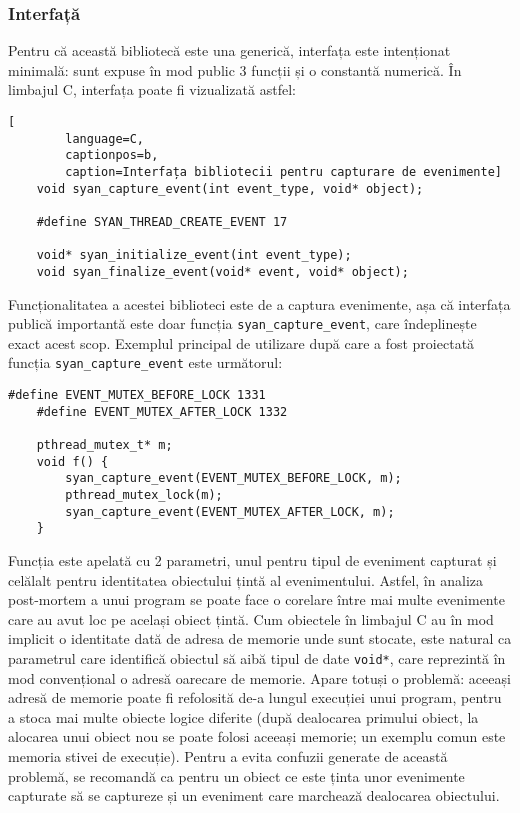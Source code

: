 \subsubsection{Interfață}
Pentru că această bibliotecă este una generică, interfața este
intenționat minimală: sunt expuse în mod public 3 funcții și o constantă
numerică. În limbajul C, interfața poate fi vizualizată astfel:
\begin{lstlisting}[
        language=C,
        captionpos=b,
        caption=Interfața bibliotecii pentru capturare de evenimente]
    void syan_capture_event(int event_type, void* object);

    #define SYAN_THREAD_CREATE_EVENT 17

    void* syan_initialize_event(int event_type);
    void syan_finalize_event(void* event, void* object);
\end{lstlisting}
Funcționalitatea a acestei biblioteci este de a captura evenimente, așa
că interfața publică importantă este doar funcția
\lstinline{syan_capture_event}, care îndeplinește exact acest scop.
Exemplul principal de utilizare după care a fost proiectată funcția
\lstinline{syan_capture_event} este următorul:
\begin{lstlisting}[caption=Exemplul 1 folosit în proiectarea interfeței]
    #define EVENT_MUTEX_BEFORE_LOCK 1331
    #define EVENT_MUTEX_AFTER_LOCK 1332

    pthread_mutex_t* m;
    void f() {
        syan_capture_event(EVENT_MUTEX_BEFORE_LOCK, m);
        pthread_mutex_lock(m);
        syan_capture_event(EVENT_MUTEX_AFTER_LOCK, m);
    }
\end{lstlisting}
Funcția este apelată cu 2 parametri, unul pentru tipul de eveniment
capturat și celălalt pentru identitatea obiectului țintă al
evenimentului. Astfel, în analiza post-mortem a unui program se poate
face o corelare între mai multe evenimente care au avut loc pe același
obiect țintă. Cum obiectele în limbajul C au în mod implicit o
identitate dată de adresa de memorie unde sunt stocate, este natural ca
parametrul care identifică obiectul să aibă tipul de date
\lstinline{void*}, care reprezintă în mod convențional o adresă oarecare
de memorie. Apare totuși o problemă: aceeași adresă de memorie poate fi
refolosită de-a lungul execuției unui program, pentru a stoca mai multe
obiecte logice diferite (după dealocarea primului obiect, la alocarea
unui obiect nou se poate folosi aceeași memorie; un exemplu comun este
memoria stivei de execuție). Pentru a evita confuzii generate de această
problemă, se recomandă ca pentru un obiect ce este ținta unor evenimente
capturate să se captureze și un eveniment care marchează dealocarea
obiectului.

